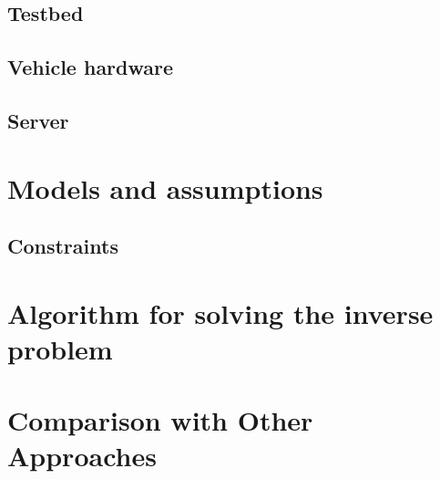 \documentclass[english]{article}\usepackage[]{graphicx}\usepackage[]{color}
\begin{document}
\subsection{Testbed}
\subsection{Vehicle hardware}
\subsection{Server}

\section{Models and assumptions}
\subsection{Constraints}

\section{Algorithm for solving the inverse problem}

\section{Comparison with Other Approaches}

\end{document}
